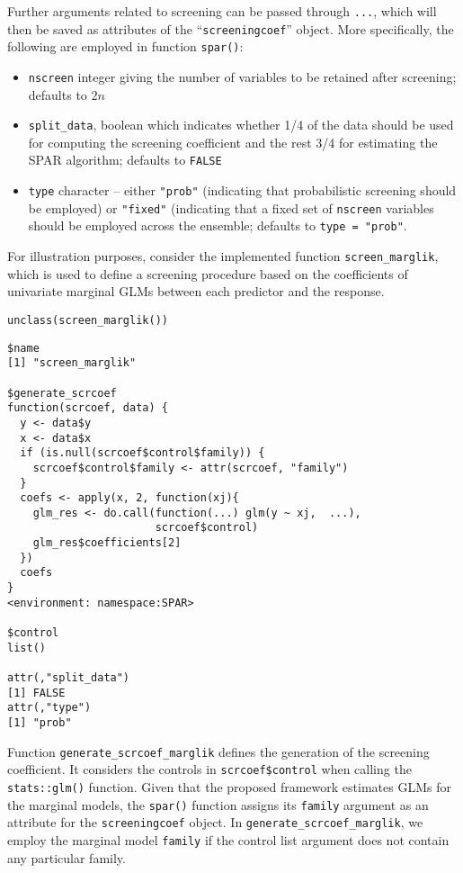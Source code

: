 \documentclass[
  article]{jss}
\begin{document}
Further arguments related to screening can be passed through
\texttt{...}, which will then be saved as attributes of the
``\texttt{screeningcoef}'' object. More specifically, the following are
employed in function \texttt{spar()}:

\begin{itemize}
\item
  \texttt{nscreen} integer giving the number of variables to be retained
  after screening; defaults to \(2n\)
\item
  \texttt{split\_data}, boolean which indicates whether 1/4 of the data
  should be used for computing the screening coefficient and the rest
  3/4 for estimating the SPAR algorithm; defaults to \texttt{FALSE}
\item
  \texttt{type} character -- either \texttt{"prob"} (indicating that
  probabilistic screening should be employed) or \texttt{"fixed"}
  (indicating that a fixed set of \texttt{nscreen} variables should be
  employed across the ensemble; defaults to \texttt{type\ =\ "prob"}.
\end{itemize}

For illustration purposes, consider the implemented function
\texttt{screen\_marglik}, which is used to define a screening procedure
based on the coefficients of univariate marginal GLMs between each
predictor and the response.

\begin{verbatim}
unclass(screen_marglik())
\end{verbatim}

\begin{verbatim}
$name
[1] "screen_marglik"

$generate_scrcoef
function(scrcoef, data) {
  y <- data$y
  x <- data$x
  if (is.null(scrcoef$control$family)) {
    scrcoef$control$family <- attr(scrcoef, "family")
  }
  coefs <- apply(x, 2, function(xj){
    glm_res <- do.call(function(...) glm(y ~ xj,  ...),
                       scrcoef$control)
    glm_res$coefficients[2]
  })
  coefs
}
<environment: namespace:SPAR>

$control
list()

attr(,"split_data")
[1] FALSE
attr(,"type")
[1] "prob"
\end{verbatim}

Function \texttt{generate\_scrcoef\_marglik} defines the generation of
the screening coefficient. It considers the controls in
\texttt{scrcoef\$control} when calling the \texttt{stats::glm()}
function. Given that the proposed framework estimates GLMs for the
marginal models, the \texttt{spar()} function assigns its
\texttt{family} argument as an attribute for the \texttt{screeningcoef}
object. In \texttt{generate\_scrcoef\_marglik}, we employ the marginal
model \texttt{family} if the control list argument does not contain any
particular family.
\end{document}
